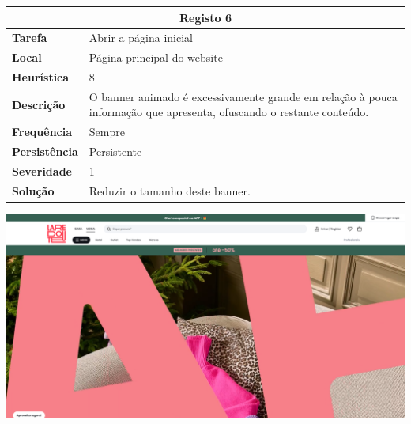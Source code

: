 \documentclass[a4paper,12pt]{article}
\begin{document}
\begin{center}
    \newpage
    \begin{table}[h!]
        \centering
        \begin{tabular}{|m{3cm}|m{12cm}|}
            \hline
            \multicolumn{2}{|c|}{\textbf{Registo 6}}                                                                                                     \\ \hline
            \textbf{Tarefa}       & Abrir a página inicial                                                                                               \\ \hline
            \textbf{Local}        & Página principal do website                                                                                          \\ \hline
            \textbf{Heurística}   & 8                                                                                                                    \\ \hline
            \textbf{Descrição}    & O banner animado é excessivamente grande em relação à pouca informação que apresenta, ofuscando o restante conteúdo. \\ \hline
            \textbf{Frequência}   & Sempre                                                                                                               \\ \hline
            \textbf{Persistência} & Persistente                                                                                                          \\ \hline
            \textbf{Severidade}   & 1                                                                                                                    \\ \hline
            \textbf{Solução}      & Reduzir o tamanho deste banner.                                                                                      \\ \hline
        \end{tabular}
    \end{table}

    \vspace{0.5cm}
    \includegraphics[width=\textwidth, keepaspectratio]{heuristics/05informacao_homepage.png}


\end{center}
\end{document}
